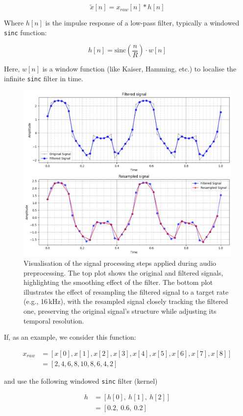 \documentclass[conference]{IEEEtran}
\begin{document}
	$$\tilde{x}[n] = x_{raw}[n] * h[n]$$
	
	Where $h[n]$ is the impulse response of a low-pass filter, typically a windowed \texttt{sinc} function:
	
	$$h[n] = \text{sinc}\left(\frac{n}{R}\right) \cdot w[n]$$
	
	Here, $w[n]$ is a window function (like Kaiser, Hamming, etc.) to localise the infinite \texttt{sinc} filter in time.
	
	\begin{figure}[H]
		\centering
		\includegraphics[width=0.9\linewidth]{img/img-resampling}
		\caption{Visualisation of the signal processing steps applied during audio preprocessing. The top plot shows the original and filtered signals, highlighting the smoothing effect of the filter. The bottom plot illustrates the effect of resampling the filtered signal to a target rate (e.g., 16\,kHz), with the resampled signal closely tracking the filtered one, preserving the original signal's structure while adjusting its temporal resolution.}
		\label{fig:img-resampling}
	\end{figure}
	
	If, as an example, we consider this function:
	
	\begin{align*}
		x_{raw} &=[x[0], x[1], x[2], x[3], x[4], x[5], x[6], x[7], x[8]]\\
		&=[2, 4, 6, 8, 10, 8, 6, 4, 2]
	\end{align*}
	
	and use the following windowed \texttt{sinc} filter (kernel)
	
	\begin{align*}
		h &= [h[0],\ h[1],\ h[2]]\\
		&= [0.2,\ 0.6,\ 0.2]
	\end{align*}
	
\end{document}
